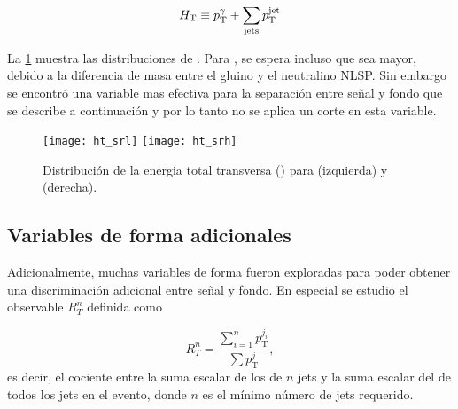 \begin{equation} \label{eq:htaddition}
  H_{\mathrm{T}} \equiv p_{\mathrm{T}}^{\gamma} + \sum_{\mathrm{jets}} p_{\mathrm{T}}^\mathrm{jet}
\end{equation}

La \cref{fig:opt_ht} muestra las distribuciones de {\HT}.
Para {\SRL}, se espera incluso que {\HT} sea mayor, debido a la
diferencia de masa entre el gluino y el neutralino NLSP. Sin embargo
se encontró una variable mas efectiva para la separación entre señal y
fondo que se describe a continuación y por lo tanto no se aplica un corte
en esta variable.


\begin{figure}[!htbp]
  \centering
  \texttt{[image: ht\_srl]} %
  \texttt{[image: ht\_srh]} %
  \caption{Distribución de la energia total transversa (\HT) para {\SRL} (izquierda)
    y {\SRH} (derecha).}
  \label{fig:opt_ht}
\end{figure}


\subsection{Variables de forma adicionales}\label{sec:shape_vars}

Adicionalmente, muchas variables de forma fueron exploradas para poder obtener
una discriminación adicional entre señal y fondo. En especial se estudio el
observable $R_T^n$ definida como

\begin{equation}\label{eq:rt_formula}
  R_{T}^{n} = \frac{\sum_{i=1}^{n}p_\mathrm{T}^{j_i}}{\sum p_\mathrm{T}^{j}},
\end{equation}
%
es decir, el cociente entre la suma escalar de los {\pt} de $n$ jets y la suma
escalar del {\pt} de todos los jets en el evento, donde $n$ es el mínimo número
de jets requerido.

